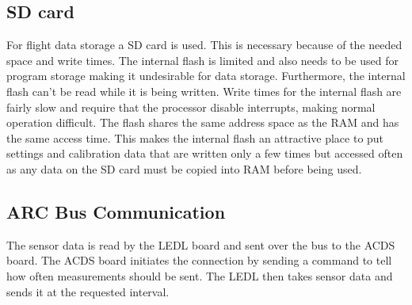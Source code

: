 \subsection{SD card}

For flight data storage a SD card is used. This is necessary because of the needed space and write times. The internal flash is limited and also needs to be used for program storage making it undesirable for data storage. Furthermore, the internal flash can't be read while it is being written. Write times for the internal flash are fairly slow and require that the processor disable interrupts, making normal operation difficult. The flash shares the same address space as the \ac{RAM} and has the same access time. This makes the internal flash an attractive place to put settings and calibration data that are written only a few times but accessed often as any data on the SD card must be copied into \ac{RAM} before being used.

\subsection{\acs*{ARC} Bus Communication}

The sensor data is read by the \ac{LEDL} board and sent over the bus to the \ac{ACDS} board. The \ac{ACDS} board initiates the connection by sending a command to tell how often measurements should be sent. The \ac{LEDL} then takes sensor data and sends it at the requested interval.

